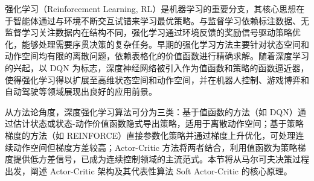 



强化学习\cite{liu2018survey}（Reinforcement Learning, RL）是机器学习的重要分支，其核心思想在于智能体通过与环境不断交互试错来学习最优策略。与监督学习\cite{yin2016survey}依赖标注数据、无监督学习关注数据内在结构不同，强化学习通过环境反馈的奖励信号驱动策略优化，能够处理需要序贯决策的复杂任务。早期的强化学习方法主要针对状态空间和动作空间均有限的离散问题，依赖表格化的价值函数进行精确求解。随着深度学习的兴起，以 DQN\cite{mnih2015human} 为标志，深度神经网络被引入作为值函数和策略的函数逼近器，使得强化学习得以扩展至高维状态空间和动作空间，并在机器人控制、游戏博弈和自动驾驶等领域展现出良好的应用前景。

从方法论角度，深度强化学习算法可分为三类：基于值函数的方法（如 DQN）通过估计状态或状态-动作价值函数隐式导出策略，适用于离散动作空间；基于策略梯度的方法（如 REINFORCE）直接参数化策略并通过梯度上升优化，可处理连续动作空间但梯度方差较高；Actor-Critic 方法将两者结合，利用值函数为策略梯度提供低方差信号，已成为连续控制领域的主流范式。本节将从马尔可夫决策过程出发，阐述 Actor-Critic 架构及其代表性算法 Soft Actor-Critic 的核心原理。


